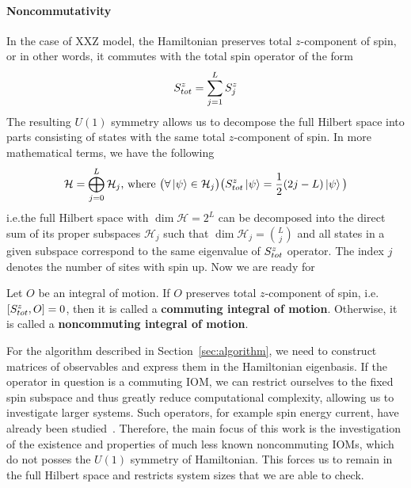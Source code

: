 \paragraph{Noncommutativity}In the case of XXZ model, the Hamiltonian preserves total \(z\)-component of spin,
or in other words, it commutes with the total spin operator of the form
\begin{equation}
  S^{z}_{tot} = \sum_{j = 1}^{L} S^{z}_j
  \label{eq:magnetization}
\end{equation}
The resulting \(U(1)\) symmetry allows us to decompose the full Hilbert space into parts consisting of states with the same total \(z\)-component
of spin. In more mathematical terms, we have the following
\begin{equation*}
  \mathcal{H} = \bigoplus_{j = 0}^{L} \mathcal{H}_j \text{, where } \big(\forall \ket{\psi} \in \mathcal{H}_j \big) \big(S^{z}_{tot} \ket{\psi} = \frac{1}{2}(2j-L) \ket{\psi} \big)
\end{equation*}
i.e.\;the full Hilbert space with \(\dim{\mathcal{H}} = 2^L\) can be decomposed into the direct sum of its proper subspaces
\(\mathcal{H}_j\) such that \(\dim{\mathcal{H}_j} = \binom{L}{j}\) and all states in a given subspace correspond to the same
eigenvalue of \(S^{z}_{tot}\) operator. The index \(j\) denotes the number of sites with spin up.
Now we are ready for
\begin{definition}
  Let \(O\) be an integral of motion. If \(O\) preserves total \(z\)-component of spin, i.e.
  \(\comm{\Sz_{tot}}{O} = 0\), then it is called a \textbf{commuting integral of motion}.
  Otherwise, it is called a \textbf{noncommuting integral of motion}.\label{def:noncomm def}
\end{definition}
For the algorithm described in Section~\ref{sec:algorithm}, we need to construct matrices of
observables and express them in the Hamiltonian eigenbasis. If the operator in question is a
commuting IOM, we can restrict ourselves to the fixed spin subspace and thus greatly reduce
computational complexity, allowing us to investigate larger systems. Such operators, for example
spin energy current, have already been studied~\autocite{Mierzejewski2015Approx}. Therefore,
the main focus of this work is the investigation of the existence and properties of much less known
noncommuting IOMs, which do not posses the \(U(1)\) symmetry of Hamiltonian. 
This forces us to remain in the full Hilbert space and restricts system sizes that we are able to check.



